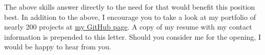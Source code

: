 The above skills answer directly to the need for \jobrequirement{} that would benefit this position best. 
In addition to the above, I encourage you to take a look at my portfolio of nearly 200 projects at \href{https://github.com/JacobArchambault}{my GitHub page}. A copy of my resume with my contact information is prepended to this letter. 
Should you consider me for the \position{} opening, 
I would be happy to hear from you. 